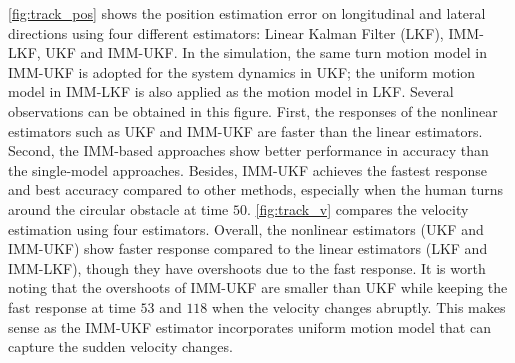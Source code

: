 \documentclass[letterpaper, 10 pt, conference]{ieeeconf}
\newcommand{\todonote}[1]{\vspace{0px} %
	\todo[inline, color=green!30]{\textbf{[Note:]} {#1}} %
}
\begin{document}
	\cref{fig:track_pos} shows the position estimation error on longitudinal and lateral directions using four different estimators: Linear Kalman Filter (LKF), IMM-LKF, UKF and IMM-UKF. 
	In the simulation, the same turn motion model in IMM-UKF is adopted for the system dynamics in UKF; the uniform motion model in IMM-LKF is also applied as the motion model in LKF.  
	Several observations can be obtained in this figure. 
	First, the responses of the nonlinear estimators such as UKF and IMM-UKF are faster than the linear estimators. 
	Second, the IMM-based approaches show better performance in accuracy than the single-model approaches.
	Besides, IMM-UKF achieves the fastest response and best accuracy compared to other methods, especially when the human turns around the circular obstacle at time $50$.
	\cref{fig:track_v} compares the velocity estimation using four estimators.
	Overall, the nonlinear estimators (UKF and IMM-UKF) show faster response compared to the linear estimators (LKF and IMM-LKF), though they have overshoots due to the fast response. 
	It is worth noting that the overshoots of IMM-UKF are smaller than UKF while keeping the fast response at time $53$ and $118$ when the velocity changes abruptly.    
	This makes sense as the IMM-UKF estimator incorporates uniform motion model that can capture the sudden velocity changes.
	
	
\end{document}
